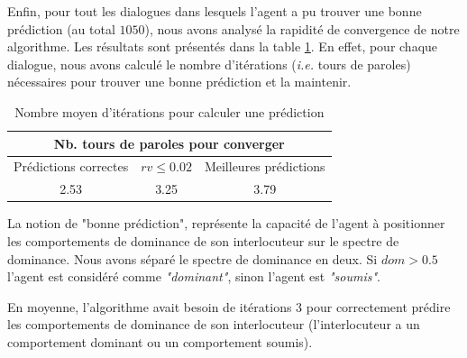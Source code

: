 	Enfin, pour tout les dialogues dans lesquels l'agent a pu trouver une bonne prédiction (au total $ 1050 $), nous avons analysé la rapidité de convergence de notre algorithme. Les résultats sont présentés dans la table \ref {tab:conv}. En effet, pour chaque dialogue, nous avons calculé le nombre d'itérations (\emph{i.e.} tours de paroles) nécessaires pour trouver une bonne prédiction et la maintenir. 
	
	
	\begin{table}[h]
		\centering
		
		\caption{Nombre moyen d'itérations pour calculer une prédiction} 
		\begin{tabular}{|c|c|c|}
			\hline
			\multicolumn{3}{|c|}{Nb. tours de paroles pour converger} \\
			\hline
			Prédictions correctes & $rv \leq 0.02$ & Meilleures prédictions \\
			\hline
			2.53 & 3.25 & 3.79\\
			\hline
		\end{tabular}
		
		\label{tab:conv}
	\end{table}
	
	La notion de "bonne prédiction", représente la capacité de l'agent à positionner les comportements de dominance de son interlocuteur sur le spectre de dominance. Nous avons séparé le spectre de dominance en deux. Si $dom > 0.5$ l'agent est considéré comme \emph{"dominant"}, sinon l'agent est \emph{"soumis"}.
	
	
	En moyenne, l'algorithme avait besoin de itérations $3$ pour correctement prédire les comportements de dominance de son interlocuteur (l'interlocuteur a un comportement dominant ou un comportement soumis). 
	

